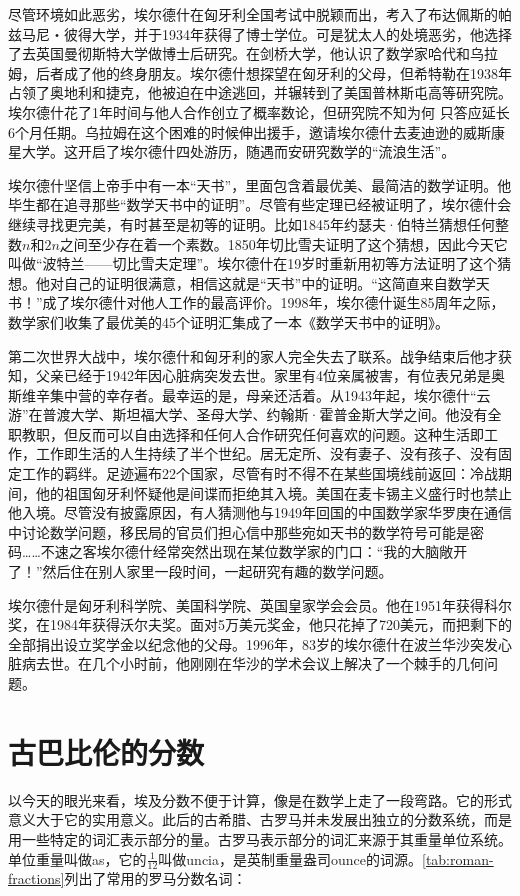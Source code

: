 \documentclass[b5paper]{ctexart}
\begin{document}
\begin{mdframed}
尽管环境如此恶劣，埃尔德什在匈牙利全国考试中脱颖而出，考入了布达佩斯的帕兹马尼・彼得大学，并于1934年获得了博士学位。可是犹太人的处境恶劣，他选择了去英国曼彻斯特大学做博士后研究。在剑桥大学，他认识了数学家哈代和乌拉姆，后者成了他的终身朋友。埃尔德什想探望在匈牙利的父母，但希特勒在1938年占领了奥地利和捷克，他被迫在中途逃回，并辗转到了美国普林斯屯高等研究院。埃尔德什花了1年时间与他人合作创立了概率数论，但研究院不知为何
只答应延长6个月任期。乌拉姆在这个困难的时候伸出援手，邀请埃尔德什去麦迪逊的威斯康星大学。这开启了埃尔德什四处游历，随遇而安研究数学的“流浪生活”。

埃尔德什坚信上帝手中有一本“天书”，里面包含着最优美、最简洁的数学证明。他毕生都在追寻那些“数学天书中的证明”。尽管有些定理已经被证明了，埃尔德什会继续寻找更完美，有时甚至是初等的证明。比如1845年约瑟夫·伯特兰猜想任何整数$n$和$2n$之间至少存在着一个素数。1850年切比雪夫证明了这个猜想，因此今天它叫做“波特兰——切比雪夫定理”。埃尔德什在19岁时重新用初等方法证明了这个猜想。他对自己的证明很满意，相信这就是“天书”中的证明。“这简直来自数学天书！”成了埃尔德什对他人工作的最高评价。1998年，埃尔德什诞生85周年之际，数学家们收集了最优美的45个证明汇集成了一本《数学天书中的证明》。

第二次世界大战中，埃尔德什和匈牙利的家人完全失去了联系。战争结束后他才获知，父亲已经于1942年因心脏病突发去世。家里有4位亲属被害，有位表兄弟是奥斯维辛集中营的幸存者。最幸运的是，母亲还活着。从1943年起，埃尔德什“云游”在普渡大学、斯坦福大学、圣母大学、约翰斯·霍普金斯大学之间。他没有全职教职，但反而可以自由选择和任何人合作研究任何喜欢的问题。这种生活即工作，工作即生活的人生持续了半个世纪。居无定所、没有妻子、没有孩子、没有固定工作的羁绊。足迹遍布22个国家，尽管有时不得不在某些国境线前返回：冷战期间，他的祖国匈牙利怀疑他是间谍而拒绝其入境。美国在麦卡锡主义盛行时也禁止他入境。尽管没有披露原因，有人猜测他与1949年回国的中国数学家华罗庚在通信中讨论数学问题，移民局的官员们担心信中那些宛如天书的数学符号可能是密码……\cite{MacTutor-Erdos-2000}不速之客埃尔德什经常突然出现在某位数学家的门口：“我的大脑敞开了！”然后住在别人家里一段时间，一起研究有趣的数学问题。

埃尔德什是匈牙利科学院、美国科学院、英国皇家学会会员。他在1951年获得科尔奖，在1984年获得沃尔夫奖。面对5万美元奖金，他只花掉了720美元，而把剩下的全部捐出设立奖学金以纪念他的父母。1996年，83岁的埃尔德什在波兰华沙突发心脏病去世。在几个小时前，他刚刚在华沙的学术会议上解决了一个棘手的几何问题。

\end{mdframed}


\section{古巴比伦的分数}
以今天的眼光来看，埃及分数不便于计算，像是在数学上走了一段弯路。它的形式意义大于它的实用意义。此后的古希腊、古罗马并未发展出独立的分数系统，而是用一些特定的词汇表示部分的量。古罗马表示部分的词汇来源于其重量单位系统。单位重量叫做as，它的$\frac{1}{12}$叫做uncia，是英制重量盎司ounce的词源。\cref{tab:roman-fractions}列出了常用的罗马分数名词：
\end{document}
